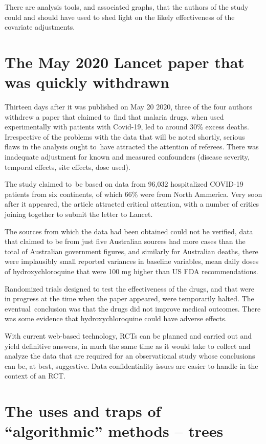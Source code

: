 \documentclass[
  10pt,
  b5paper]{book}
\begin{document}
There are analysis tools, and associated graphs, that the authors
of the study could and should have used to shed light on the likely
effectiveness of the covariate adjustments.

\hypertarget{sec:lancet}{%
\section{The May 2020 Lancet paper that was quickly withdrawn}\label{sec:lancet}}

Thirteen days after it was published on May 20 2020, three of the
four authors withdrew a paper that claimed to~find that malaria drugs,
when used experimentally with patients with Covid-19, led to around
30\% excess deaths. Irrespective of the problems with the data that
will be noted shortly, serious flaws in the analysis ought to~have
attracted the attention of referees. There was inadequate
adjustment for known and measured confounders (disease severity,
temporal effects, site effects, dose used).

The study claimed to~be based on data from 96,032
hospitalized COVID-19 patients from six continents, of which 66\%
were from North Ammerica. Very soon after it appeared, the article
attracted critical attention, with a number of critics joining
together to submit the letter \citet{watson2020open} to Lancet.

The sources from which the data had been obtained could not be verified,
data that claimed to be from just five Australian sources had more
cases than the total of Australian government figures, and similarly
for Australian deaths, there were implausibly small reported variances
in baseline variables, mean daily doses of hydroxychloroquine that were
100 mg higher than US FDA recommendations.

Randomized trials designed to test the effectiveness of the drugs,
and that were in progress at the time when the paper appeared,
were temporarily halted. The eventual~conclusion was that the
drugs did not improve medical outcomes. There was some evidence
that hydroxychloroquine could have adverse effects.

With current web-based technology, RCTs can be planned and carried out and yield definitive answers, in much the same time as it would take to collect and analyze the data that are required for an observational study whose conclusions can be, at best, suggestive. Data confidentiality issues are easier to handle in the context of an RCT.

\hypertarget{the-uses-and-traps-of-algorithmic-methods-trees}{%
\section{The uses and traps of ``algorithmic'' methods -- trees}\label{the-uses-and-traps-of-algorithmic-methods-trees}}
\end{document}
